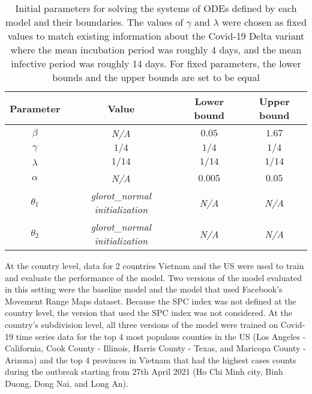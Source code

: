 \begin{table}[h]
    \centering
    \begin{tabular}{| c | c | c | c |}
        Parameter & Value & Lower bound & Upper bound \\
        \hline\hline
        $\beta$ & \textit{N/A} & $0.05$ & $1.67$ \\
        \hline
        $\gamma$ & $1/4$ & $1/4$ & $1/4$ \\
        \hline
        $\lambda$ & $1/14$ & $1/14$ & $1/14$ \\
        \hline
        $\alpha$ & \textit{N/A} & $0.005$ & $0.05$ \\
        \hline
        $\theta_1$ & \textit{glorot\_normal initialization} & \textit{N/A} & \textit{N/A} \\
        \hline
        $\theta_2$ & \textit{glorot\_normal initialization} & \textit{N/A} & \textit{N/A} \\
        \hline
    \end{tabular}
    \caption[Experiment initial parameters]{Initial parameters for solving the systems of ODEs defined by each model and their boundaries. The values of $\gamma$ and $\lambda$ were chosen as fixed values to match existing information about the Covid-19 Delta variant \cite{mahaseDeltaVariantWhat2021} where the mean incubation period was roughly 4 days, and the mean infective period was roughly 14 days. For fixed parameters, the lower bounds and the upper bounds are set to be equal}
    \label{tab:ude-model-initial-parameters}
\end{table}

At the country level, data for 2 countries Vietnam and the \gls{US} were used to train and evaluate the performance of the model.
Two versions of the model evaluated in this setting were the baseline model and the model that used Facebook's Movement Range Maps dataset.
Because the \gls{SPC} index was not defined at the country level, the version that used the \gls{SPC} index was not considered.
At the country's subdivision level, all three versions of the model were trained on Covid-19 time series data for the top 4 most populous counties in the \gls{US} (Los Angeles - California, Cook County - Illinois, Harris County - Texas, and Maricopa County - Arizona) and the top 4 provinces in Vietnam that had the highest cases counts during the outbreak starting from 27th April 2021 (Ho Chi Minh city, Binh Duong, Dong Nai, and Long An).

